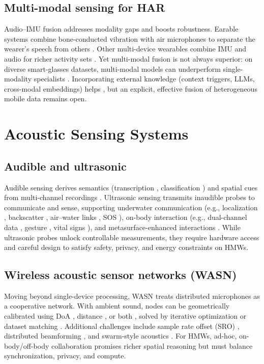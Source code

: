 \subsection{Multi-modal sensing for HAR}
Audio–IMU fusion addresses modality gaps and boosts robustness. Earable systems combine bone-conducted vibration with air microphones to separate the wearer's speech from others \cite{he2023towards}. Other multi-device wearables combine IMU and audio for richer activity sets \cite{min2018exploring, mollyn2022samosa, bhattacharya2022leveraging}. Yet multi-modal fusion is not always superior: on diverse smart-glasses datasets, multi-modal models can underperform single-modality specialists \cite{gong2023mmg, huang2022modality}. Incorporating external knowledge (context triggers, LLMs, cross-modal embeddings) helps \cite{mollyn2022samosa, yang2025contextagent, xu2024autolife, han2023onellm, girdhar2023imagebind, yang2024drhouse}, but an explicit, effective fusion of heterogeneous mobile data remains open.

\section{Acoustic Sensing Systems}

\subsection{Audible and ultrasonic}
Audible sensing derives semantics (transcription \cite{gao2023funasr}, classification \cite{gemmeke2017audio}) and spatial cues from multi-channel recordings \cite{wang2019doa}. Ultrasonic sensing transmits inaudible probes to communicate and sense, supporting underwater communication (e.g., localization \cite{chen2022underwater, chen2023underwater}, backscatter \cite{jang2019underwater}, air–water links \cite{tonolini2018networking}, SOS \cite{yang2023aquahelper}), on-body interaction (e.g., dual-channel data \cite{qian2021aircode}, gesture \cite{wang2020push}, vital signs \cite{wang2022loear}), and metasurface-enhanced interactions \cite{zhang2023acoustic}. While ultrasonic probes unlock controllable measurements, they require hardware access and careful design to satisfy safety, privacy, and energy constraints on HMWs.

\subsection{Wireless acoustic sensor networks (WASN)}
Moving beyond single-device processing, WASN treats distributed microphones as a cooperative network. With ambient sound, nodes can be geometrically calibrated \cite{gburrek2021geometry} using DoA \cite{wang2019doa}, distance \cite{gburrek2021iterative}, or both \cite{gburrek2021geometry}, solved by iterative optimization \cite{fischler1981random} or dataset matching \cite{hennecke2009hierarchical}. Additional challenges include sample rate offset (SRO) \cite{gburrek2022synchronization}, distributed beamforming \cite{gburrek2023integration}, and swarm-style acoustics \cite{itani2023creating}. For HMWs, ad-hoc, on-body/off-body collaboration promises richer spatial reasoning but must balance synchronization, privacy, and compute.

